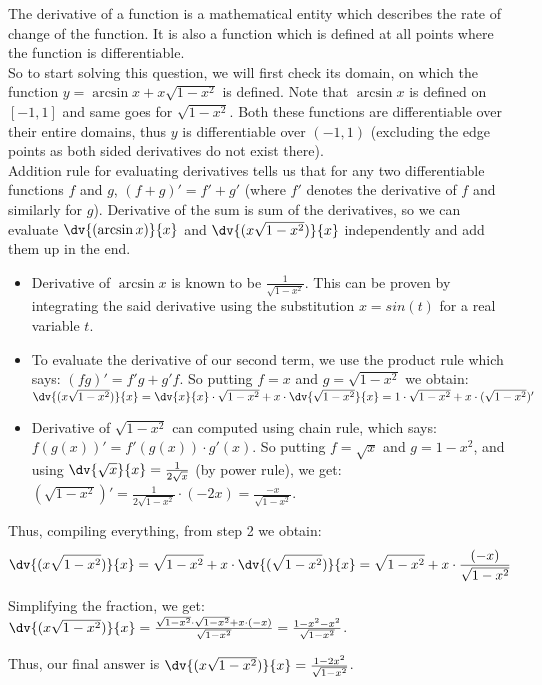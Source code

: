 The derivative of a function is a mathematical entity which describes the rate of change of the function. It is also a function which is defined at all points where the function is differentiable.
\\
So to start solving this question, we will first check its domain, on which the function \(y= \arcsin x+x\sqrt{1-x^{2}}\) is defined. Note that \(\arcsin x\) is defined on \([-1,1]\) and same goes for \(\sqrt{1-x^2}\). Both these functions are differentiable over their entire domains, thus \(y\) is differentiable over \((-1,1)\) (excluding the edge points as both sided derivatives do not exist there).
\\
Addition rule for evaluating derivatives tells us that for any two differentiable functions \(f\) and \(g\), \((f+g)' = f' + g'\) (where \(f'\) denotes the derivative of \(f\) and similarly for \(g\)). Derivative of the sum is sum of the derivatives, so we can evaluate \(\dv{(\arcsin x)}{x}\) and \(\dv{(x\sqrt{1-x^2})}{x}\) independently and add them up in the end.
\begin{itemize}
    \item Derivative of \(\arcsin x\) is known to be \(\frac{1}{\sqrt{1-x^2}}\). This can be proven by integrating the said derivative using the substitution \(x=sin(t)\) for a real variable \(t\).
    \item To evaluate the derivative of our second term, we use the product rule which says: \((fg)' = f'g + g'f\). So putting \(f = x\) and \(g = \sqrt{1-x^2}\) we obtain: \(\dv{(x\sqrt{1-x^2})}{x} = \dv{x}{x}\cdot \sqrt{1-x^2} + x\cdot \dv{\sqrt{1-x^2}}{x} = 1\cdot\sqrt{1-x^2} + x\cdot(\sqrt{1-x^2})'\)
    \item Derivative of \(\sqrt{1-x^2}\) can computed using chain rule, which says: \(f(g(x))' = f'(g(x))\cdot g'(x)\). So putting \(f = \sqrt x\) and \(g=1-x^2\), and using \(\dv{\sqrt x}{x} = \frac{1}{2\sqrt x}\) (by power rule), we get: \((\sqrt{1-x^2})' = \frac{1}{2\sqrt{1-x^2}}\cdot (-2x) = \frac{-x}{\sqrt{1-x^2}}\).
\end{itemize}
Thus, compiling everything, from step 2 we obtain: 
\[\dv{(x\sqrt{1-x^2})}{x} = \sqrt{1-x^2} + x\cdot\dv{(\sqrt{1-x^2})}{x} = \sqrt{1-x^2} + x\cdot\frac{(-x)}{\sqrt{1-x^2}}\]

Simplifying the fraction, we get: \(\dv{(x\sqrt{1-x^2})}{x} = \frac{\sqrt{1-x^2}\cdot \sqrt{1-x^2} + x\cdot(-x)}{\sqrt{1-x^2}} =  \frac{1-x^2 - x^2}{\sqrt{1-x^2}}\).

Thus, our final answer is \(\dv{(x\sqrt{1-x^2})}{x} = \frac{1-2x^2}{\sqrt{1-x^2}}\).
